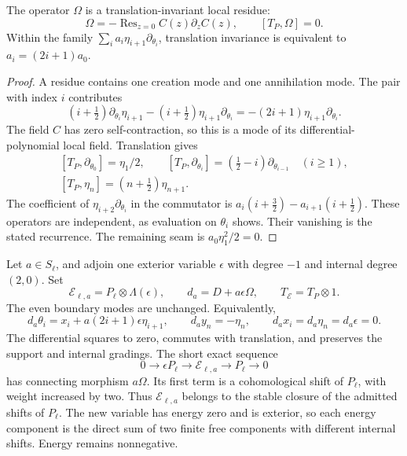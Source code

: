 \begin{lemma}\label{lem:vol2-residue-translation}
The operator \(\Omega\) is a translation-invariant local
residue:
\[
 \Omega=-\operatorname{Res}_{z=0}C(z)\partial_z C(z),
 \qquad [T_P,\Omega]=0.
\]
Within the family \(\sum_i a_i\eta_{i+1}\partial_{\theta_i}\),
translation invariance is equivalent to
\(a_i=(2i+1)a_0\).
\end{lemma}
\begin{proof}
A residue contains one creation mode and one annihilation
mode. The pair with index \(i\) contributes
\[
 (i+\tfrac12)\partial_{\theta_i}\eta_{i+1}
 -(i+\tfrac12)\eta_{i+1}\partial_{\theta_i}
 =-(2i+1)\eta_{i+1}\partial_{\theta_i}.
\]
The field \(C\) has zero self-contraction, so this is a mode
of its differential-polynomial local field.
Translation gives
\[
 \begin{gathered}
 [T_P,\partial_{\theta_0}]=\eta_1/2,\qquad
 [T_P,\partial_{\theta_i}]
       =(\tfrac12-i)\partial_{\theta_{i-1}}\quad(i\ge1),\\
 [T_P,\eta_n]=(n+\tfrac12)\eta_{n+1}.
 \end{gathered}
\]
The coefficient of
\(\eta_{i+2}\partial_{\theta_i}\) in the commutator is
\(a_i(i+\tfrac32)-a_{i+1}(i+\tfrac12)\).
These operators are independent, as evaluation on \(\theta_i\)
shows. Their vanishing is the stated recurrence. The remaining
seam is \(a_0\eta_1^2/2=0\).
\end{proof}

Let \(a\in S_\ell\), and adjoin one exterior variable
\(\epsilon\) with degree \(-1\) and internal degree \((2,0)\).
Set
\begin{equation}\label{eq:vol2-residue-cone}
 \mathcal E_{\ell,a}=P_\ell\otimes\Lambda(\epsilon),
 \qquad d_a=D+a\epsilon\Omega,\qquad
 T_{\mathcal E}=T_P\otimes1.
\end{equation}
The even boundary modes are unchanged. Equivalently,
\[
 d_a\theta_i=x_i+a(2i+1)\epsilon\eta_{i+1},\qquad
 d_a y_n=-\eta_n,\qquad
 d_a x_i=d_a\eta_n=d_a\epsilon=0.
\]
The differential squares to zero, commutes with translation,
and preserves the support and internal gradings. The short
exact sequence
\[
 0\longrightarrow\epsilon P_\ell
 \longrightarrow\mathcal E_{\ell,a}
 \longrightarrow P_\ell\longrightarrow0
\]
has connecting morphism \(a\Omega\). Its first term is a
cohomological shift of \(P_\ell\), with weight increased by two.
Thus \(\mathcal E_{\ell,a}\) belongs to the stable closure of
the admitted shifts of \(P_\ell\).
The new variable has energy zero and is exterior, so each
energy component is the direct sum of two finite free
components with different internal shifts. Energy remains
nonnegative.

